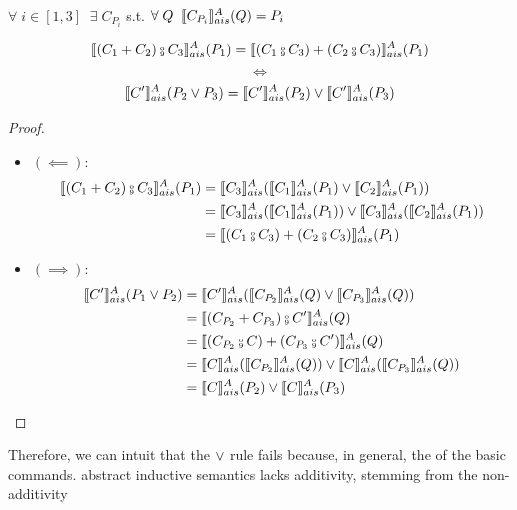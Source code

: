 \documentclass[
  10pt,       %
  twoside,    %
  a4paper,    %
  english,    %
  tikz,       %
  openright,  %
]{book}
\begin{document}
\begin{theorem} $\;$\\
  $\forall \; i \in [1, 3] \;\; \exists \; C_{P_i}$ s.t. 
  $\forall \; Q \;\; \llbracket C_{P_i} \rrbracket_{ais}^{A}(Q) = P_i$

  $$\asem{(C_1 + C_2) \fcmp C_3}(P_1) = \asem{(C_1 \fcmp C_3) + (C_2 \fcmp C_3)}(P_1)$$
  $$\iff$$
  $$\llbracket C' \rrbracket_{ais}^{A}(P_2 \lor P_3) = \llbracket C' \rrbracket_{ais}^{A}(P_2) \lor \llbracket C' \rrbracket_{ais}^{A}(P_3)$$
\end{theorem}
\begin{proof} $\;$\\
  \begin{itemize}
    \item $(\impliedby)$:
      \begin{align*}
        \asem{(C_1 + C_2) \fcmp C_3}(P_1)
          &= \asem{C_3}(\asem{C_1}(P_1) \join \asem{C_2}(P_1)) \\
          &= \asem{C_3}(\asem{C_1}(P_1)) \join \asem{C_3}(\asem{C_2}(P_1)) \\
          &= \asem{(C_1 \fcmp C_3) + (C_2 \fcmp C_3)}(P_1)
      \end{align*}
    \item $(\implies)$:
      \begin{align*}
        \asem{C'}(P_1 \join P_2) 
          &= \asem{C'}(\asem{C_{P_2}}(Q) \join \asem{C_{P_3}}(Q)) \\
          &= \asem{(C_{P_2} + C_{P_3}) \fcmp C'}(Q) \\
          &= \asem{(C_{P_2} \fcmp C) + (C_{P_3} \fcmp C')}(Q) \\
          &= \asem{C}(\asem{C_{P_2}}(Q)) \join \asem{C}(\asem{C_{P_3}}(Q)) \\
          &= \asem{C}(P_2) \join \asem{C}(P_3)
      \end{align*}
  \end{itemize}
\end{proof}

Therefore, we can intuit that the $\lor$ rule fails because, in general, the
of the basic commands.
abstract inductive semantics lacks additivity, stemming from the non-additivity
\end{document}
